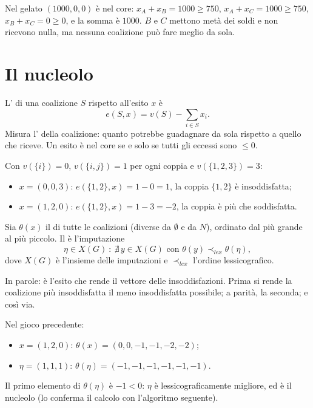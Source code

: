 \begin{esempio}
Nel gelato $(1000, 0, 0)$ è nel core: $x_A + x_B = 1000 \ge 750$, $x_A + x_C = 1000 \ge 750$,
$x_B + x_C = 0 \ge 0$, e la somma è $1000$. $B$ e $C$ mettono metà dei soldi e non ricevono
nulla, ma nessuna coalizione può fare meglio da sola. 
\end{esempio}

\section{Il nucleolo}

\begin{definizione}[Eccesso]
L' di una coalizione $S$ rispetto all'esito $x$ è
\[
  e(S, x) = v(S) - \sum_{i \in S} x_i .
\]
Misura l' della coalizione: quanto potrebbe guadagnare da sola rispetto
a quello che riceve. Un esito è nel core se e solo se tutti gli eccessi sono $\le 0$.
\end{definizione}

\begin{esempio}[eccessi]
Con $v(\{i\}) = 0$, $v(\{i,j\}) = 1$ per ogni coppia e $v(\{1,2,3\}) = 3$:
\begin{itemize}
  \item $x = (0,0,3)$: $e(\{1,2\},x) = 1 - 0 = 1$, la coppia $\{1,2\}$ è insoddisfatta;
  \item $x = (1,2,0)$: $e(\{1,2\},x) = 1 - 3 = -2$, la coppia è più che soddisfatta.
\end{itemize}
\end{esempio}

\begin{definizione}[Nucleolo]
Sia $\theta(x)$ il  di tutte le coalizioni (diverse da $\emptyset$
e da $N$), ordinato dal più grande al più piccolo. Il  è l'imputazione
\[
  \eta \in X(G) \ :\ \nexists\, y \in X(G) \text{ con } \theta(y) \prec_{lex} \theta(\eta),
\]
dove $X(G)$ è l'insieme delle imputazioni e $\prec_{lex}$ l'ordine lessicografico.
\end{definizione}
In parole: è l'esito che rende  il vettore delle
insoddisfazioni. Prima si rende la coalizione più insoddisfatta il meno insoddisfatta
possibile; a parità, la seconda; e così via.

\begin{esempio}
Nel gioco precedente:
\begin{itemize}
  \item $x = (1,2,0)$: $\theta(x) = (0, 0, -1, -1, -2, -2)$;
  \item $\eta = (1,1,1)$: $\theta(\eta) = (-1,-1,-1,-1,-1,-1)$.
\end{itemize}
Il primo elemento di $\theta(\eta)$ è $-1 < 0$: $\eta$ è lessicograficamente migliore, ed è
il nucleolo (lo conferma il calcolo con l'algoritmo seguente).
\end{esempio}

